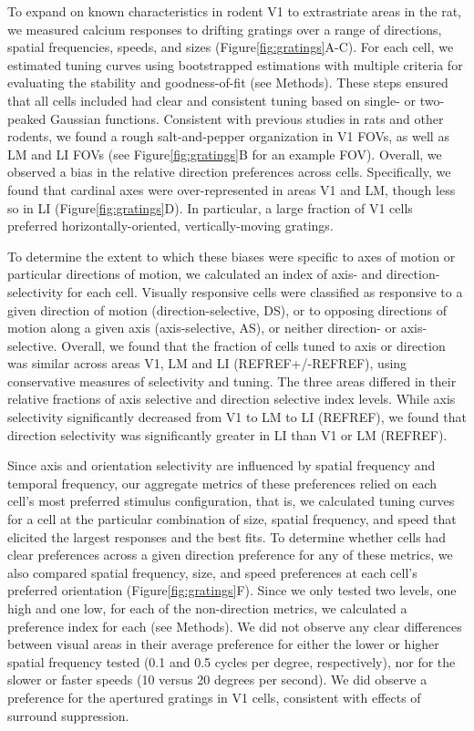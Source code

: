 To expand on known characteristics in rodent V1 to extrastriate areas in the rat, we measured calcium responses to drifting gratings over a range of directions, spatial frequencies, speeds, and sizes (Figure\ref{fig:gratings}A-C). For each cell, we estimated tuning curves using bootstrapped estimations with multiple criteria for evaluating the stability and goodness-of-fit (see Methods)\cite{Liang2018}. These steps ensured that all cells included had clear and consistent tuning based on single- or two-peaked Gaussian functions. Consistent with previous studies in rats and other rodents, we found a rough salt-and-pepper organization in V1 FOVs, as well as LM and LI FOVs (see Figure\ref{fig:gratings}B for an example FOV). Overall, we observed a bias in the relative direction preferences across cells. Specifically, we found that cardinal axes were over-represented in areas V1 and LM, though less so in LI (Figure\ref{fig:gratings}D). In particular, a large fraction of V1 cells preferred horizontally-oriented, vertically-moving gratings.  

To determine the extent to which these biases were specific to axes of motion or particular directions of motion, we calculated an index of axis- and direction-selectivity for each cell. Visually responsive cells were classified as responsive to a given direction of motion (direction-selective, DS), or to opposing directions of motion along a given axis (axis-selective, AS), or neither direction- or axis-selective. Overall, we found that the fraction of cells tuned to axis or direction was similar across areas V1, LM and LI (REFREF+/-REFREF), using conservative measures of selectivity and tuning. The three areas differed in their relative fractions of axis selective and direction selective index levels. While axis selectivity significantly decreased from V1 to LM to LI (REFREF), we found that direction selectivity was significantly greater in LI than V1 or LM (REFREF). 

Since axis and orientation selectivity are influenced by spatial frequency and temporal frequency\cite{REFREF}, our aggregate metrics of these preferences relied on each cell's most preferred stimulus configuration, that is, we calculated tuning curves for a cell at the particular combination of size, spatial frequency, and speed that elicited the largest responses and the best fits. To determine whether cells had clear preferences across a given direction preference for any of these metrics, we also compared spatial frequency, size, and speed preferences at each cell's preferred orientation (Figure\ref{fig:gratings}F). Since we only tested two levels, one high and one low, for each of the non-direction metrics, we calculated a preference index for each (see Methods). We did not observe any clear differences between visual areas in their average preference for either the lower or higher spatial frequency tested (0.1 and 0.5 cycles per degree, respectively), nor for the slower or faster speeds (10 versus 20 degrees per second). We did observe a preference for the apertured gratings in V1 cells, consistent with effects of surround suppression.

